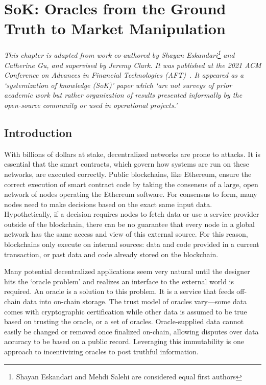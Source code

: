\chapter{SoK: Oracles from the Ground Truth to Market Manipulation} \label{ch:oracle}

\textit{
This chapter is adapted from work co-authored by Shayan Eskandari\footnote{Shayan Eskandari and Mehdi Salehi are considered equal first authors} and Catherine Gu, and supervised by Jeremy Clark. It was published at the 2021 ACM Conference on Advances in Financial Technologies (AFT)~\cite{eskandari2021sok}. It appeared as a `systemization of knowledge (SoK)' paper which `are not surveys of prior academic work but rather organization of results presented informally by the open-source community or used in operational projects.'
}

\section{Introduction} \label{sec:intro}

With billions of dollars at stake, decentralized networks are prone to attacks. It is essential that the smart contracts, which govern how systems are run on these networks, are executed correctly. Public blockchains, like Ethereum, ensure the correct execution of smart contract code by taking the consensus of a large, open network of nodes operating the Ethereum software. For consensus to form, many nodes need to make decisions based on the exact same input data. Hypothetically, if a decision requires nodes to fetch data or use a service provider outside of the blockchain, there can be no guarantee that every node in a global network has the same access and view of this external source. For this reason, blockchains only execute on internal sources: data and code provided in a current transaction, or past data and code already stored on the blockchain.

Many potential decentralized applications seem very natural until the designer hits the `oracle problem' and realizes an interface to the external world is required. An oracle is a solution to this problem. It is a service that feeds off-chain data into on-chain storage. The trust model of oracles vary---some data comes with cryptographic certification while other data is assumed to be true based on trusting the oracle, or a set of oracles. Oracle-supplied data cannot easily be changed or removed once finalized on-chain, allowing disputes over data accuracy to be based on a public record. Leveraging this immutability is one approach to incentivizing oracles to post truthful information.

